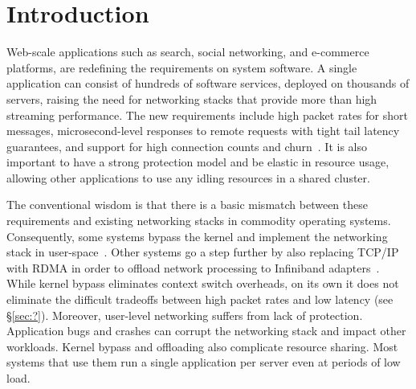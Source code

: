 
\section{Introduction}
\label{sec:intro}


Web-scale applications such as search, social networking, and
e-commerce platforms, are redefining the requirements on system
software. A single application can consist of hundreds of software
services, deployed on thousands of servers, raising the need for
networking stacks that provide more than high streaming performance.
The new requirements include high packet rates for short messages,
microsecond-level responses to remote requests with tight tail latency
guarantees, and support for high connection counts and
churn~\cite{Atikoglu:2012:WAL,DBLP:journals/cacm/DeanB13,DBLP:conf/nsdi/NishtalaFGKLLMPPSSTV13}.
It is also important to have a strong protection model and be elastic
in resource usage, allowing other applications to use any idling
resources in a shared
cluster. %

The conventional wisdom is that there is a basic mismatch between
these requirements and existing networking stacks in commodity
operating systems. Consequently, some systems bypass the kernel and
implement the networking stack in
user-space~\cite{DBLP:conf/sigcomm/ThekkathNML93,openonload,DBLP:conf/cloud/KapoorPTVV12,jeong2014mtcp,sandstorm}.
Other systems go a step further by also replacing TCP/IP with RDMA in
order to offload network processing to Infiniband
adapters~\cite{DBLP:conf/icpp/JoseSLZHWIOWSP11,dragojevic14farm,mitchell:rdma,DBLP:conf/sosp/OngaroRSOR11}.
While kernel bypass eliminates context switch overheads, on its own it
does not eliminate the difficult tradeoffs between high packet rates
and low latency (see \S \ref{sec:?}). Moreover, user-level networking
suffers from lack of protection. Application bugs and crashes can
corrupt the networking stack and impact other workloads.  Kernel
bypass and offloading also complicate resource sharing. Most systems
that use them run a single application per server even at periods of
low load.




